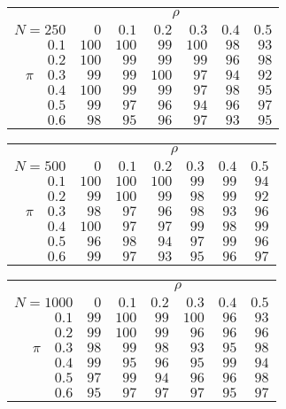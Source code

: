 \begin{tabular}{r|rrrrrr}
\hline\hline
 &\multicolumn{6}{c}{$\rho$} \\ 
 $N = 250$ & $0$ & $0.1$ & $0.2$ & $0.3$ & $0.4$ & $0.5$ \\ 
 \hline$0.1$ & $100$ & $100$ & $99$ & $100$ & $98$ & $93$\\ 
$0.2$ & $100$ & $99$ & $99$ & $99$ & $96$ & $98$\\ 
$\pi\quad$$0.3$ & $99$ & $99$ & $100$ & $97$ & $94$ & $92$\\ 
$0.4$ & $100$ & $99$ & $99$ & $97$ & $98$ & $95$\\ 
$0.5$ & $99$ & $97$ & $96$ & $94$ & $96$ & $97$\\ 
$0.6$ & $98$ & $95$ & $96$ & $97$ & $93$ & $95$\\ 
 \hline 
 \end{tabular}
 
 \vspace{2em} 
 
\begin{tabular}{r|rrrrrr}
\hline\hline
 &\multicolumn{6}{c}{$\rho$} \\ 
 $N = 500$ & $0$ & $0.1$ & $0.2$ & $0.3$ & $0.4$ & $0.5$ \\ 
 \hline$0.1$ & $100$ & $100$ & $100$ & $99$ & $99$ & $94$\\ 
$0.2$ & $99$ & $100$ & $99$ & $98$ & $99$ & $92$\\ 
$\pi\quad$$0.3$ & $98$ & $97$ & $96$ & $98$ & $93$ & $96$\\ 
$0.4$ & $100$ & $97$ & $97$ & $99$ & $98$ & $99$\\ 
$0.5$ & $96$ & $98$ & $94$ & $97$ & $99$ & $96$\\ 
$0.6$ & $99$ & $97$ & $93$ & $95$ & $96$ & $97$\\ 
 \hline 
 \end{tabular}
 
 \vspace{2em} 
 
\begin{tabular}{r|rrrrrr}
\hline\hline
 &\multicolumn{6}{c}{$\rho$} \\ 
 $N = 1000$ & $0$ & $0.1$ & $0.2$ & $0.3$ & $0.4$ & $0.5$ \\ 
 \hline$0.1$ & $99$ & $100$ & $99$ & $100$ & $96$ & $93$\\ 
$0.2$ & $99$ & $100$ & $99$ & $96$ & $96$ & $96$\\ 
$\pi\quad$$0.3$ & $98$ & $99$ & $98$ & $93$ & $95$ & $98$\\ 
$0.4$ & $99$ & $95$ & $96$ & $95$ & $99$ & $94$\\ 
$0.5$ & $97$ & $99$ & $94$ & $96$ & $96$ & $98$\\ 
$0.6$ & $95$ & $97$ & $97$ & $97$ & $95$ & $97$\\ 
 \hline 
 \end{tabular}